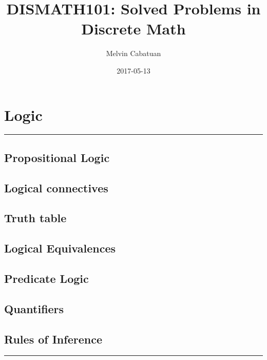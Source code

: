 \documentclass[]{book}
\title{DISMATH101: Solved Problems in Discrete Math}
\author{Melvin Cabatuan}
\date{2017-05-13}
\begin{document}
\maketitle

{
\setcounter{tocdepth}{1}
\tableofcontents
}
\chapter{Logic}\label{logic}

\begin{center}\rule{0.5\linewidth}{\linethickness}\end{center}

\section{Propositional Logic}\label{propositional-logic}

\section{Logical connectives}\label{logical-connectives}

\section{Truth table}\label{truth-table}

\section{Logical Equivalences}\label{logical-equivalences}

\section{Predicate Logic}\label{predicate-logic}

\section{Quantifiers}\label{quantifiers}

\section{Rules of Inference}\label{rules-of-inference}

\begin{center}\rule{0.5\linewidth}{\linethickness}\end{center}
\end{document}
